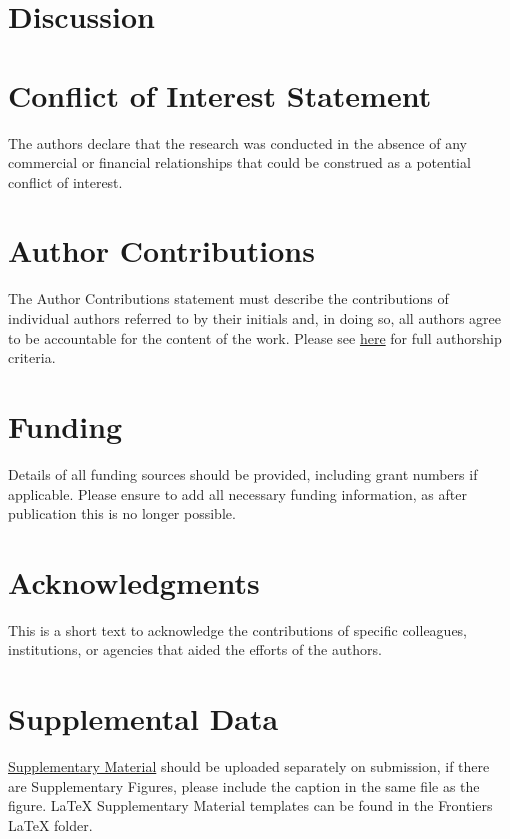 \documentclass[utf8]{style/FrontiersinHarvard}
\begin{document}
\section{Discussion}

\section*{Conflict of Interest Statement}
The authors declare that the research was conducted in the absence of any commercial or financial relationships that could be construed as a potential conflict of interest.

\section*{Author Contributions}
The Author Contributions statement must describe the contributions of individual authors referred to by their initials and, in doing so, all authors agree to be accountable for the content of the work.
Please see \href{https://www.frontiersin.org/about/policies-and-publication-ethics#AuthorshipAuthorResponsibilities}{here} for full authorship criteria.

\section*{Funding}
Details of all funding sources should be provided, including grant numbers if applicable.
Please ensure to add all necessary funding information, as after publication this is no longer possible.

\section*{Acknowledgments}
This is a short text to acknowledge the contributions of specific colleagues, institutions, or agencies that aided the efforts of the authors.

\section*{Supplemental Data}
 \href{http://home.frontiersin.org/about/author-guidelines#SupplementaryMaterial}{Supplementary Material} should be uploaded separately on submission, if there are Supplementary Figures, please include the caption in the same file as the figure. LaTeX Supplementary Material templates can be found in the Frontiers LaTeX folder.



\end{document}
